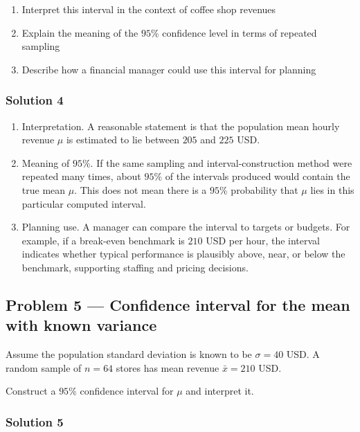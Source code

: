 \begin{enumerate}
	\item Interpret this interval in the context of coffee shop revenues
	\item Explain the meaning of the $95\%$ confidence level in terms of repeated sampling
	\item Describe how a financial manager could use this interval for planning
\end{enumerate}

\subsubsection*{Solution 4}

\begin{enumerate}
	\item Interpretation. A reasonable statement is that the population mean hourly revenue $\mu$ is estimated to lie between $205$ and $225$ USD.
	\item Meaning of $95\%$. If the same sampling and interval-construction method were repeated many times, about $95\%$ of the intervals produced would contain the true mean $\mu$. This does not mean there is a $95\%$ probability that $\mu$ lies in this particular computed interval.
	\item Planning use. A manager can compare the interval to targets or budgets. For example, if a break-even benchmark is $210$ USD per hour, the interval indicates whether typical performance is plausibly above, near, or below the benchmark, supporting staffing and pricing decisions.
\end{enumerate}


\subsection*{Problem 5 — Confidence interval for the mean with known variance}

Assume the population standard deviation is known to be $\sigma = 40$ USD. A random sample of $n = 64$ stores has mean revenue $\bar{x} = 210$ USD.

Construct a $95\%$ confidence interval for $\mu$ and interpret it.

\subsubsection*{Solution 5}


